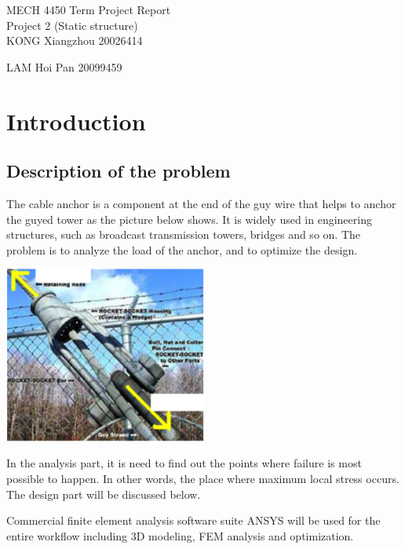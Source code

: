 \documentclass[a4paper,14pt]{extarticle}
\begin{document}
\begin{center}
{\LARGE MECH 4450 Term Project Report}\\\vspace{2em}
{\Large Project 2 (Static structure)}\\\vspace{2em}
{\Large KONG Xiangzhou 20026414}

{\Large LAM Hoi Pan 20099459}\\\vspace{1em}
\end{center}

\tableofcontents

\section{Introduction}
\subsection{Description of the problem}
The cable anchor is a component at the end of the guy wire that helps to anchor the guyed tower as the picture below shows. It is widely used in engineering structures, such as broadcast transmission towers, bridges and so on. The problem is to analyze the load of the anchor, and to optimize the design.

\begin{center}\includegraphics[width=0.5\textwidth]{DESCRIPTION.png}\end{center}

In the analysis part, it is need to find out the points where failure is most possible to happen. In other words, the place where maximum local stress occurs. The design part will be discussed below.

Commercial finite element analysis software suite ANSYS will be used for the entire workflow including 3D modeling, FEM analysis and optimization.
\end{document}
